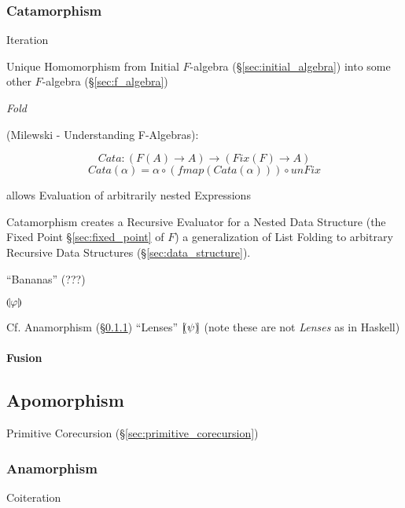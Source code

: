\subsubsection{Catamorphism}\label{sec:catamorphism}

Iteration

Unique Homomorphism from Initial $F$-algebra
(\S\ref{sec:initial_algebra}) into some other $F$-algebra
(\S\ref{sec:f_algebra})

\emph{Fold}

(Milewski - Understanding F-Algebras):

\[
  Cata : (F (A) \rightarrow A) \rightarrow (Fix (F) \rightarrow A)
\]\[
  Cata (\alpha) = \alpha \circ (fmap (Cata (\alpha))) \circ unFix
\]

allows Evaluation of arbitrarily nested Expressions

Catamorphism creates a Recursive Evaluator for a Nested Data Structure
(the Fixed Point \S\ref{sec:fixed_point} of $F$) a generalization of
List Folding to arbitrary Recursive Data Structures
(\S\ref{sec:data_structure}).

``Bananas'' (???) %

$\llparenthesis \varphi \rrparenthesis$

\fist Cf. Anamorphism (\S\ref{sec:anamorphism}) ``Lenses'' $[\kern-1.95pt(
\psi )\kern-2.0pt]$ (note these are not \emph{Lenses} as in Haskell)



\paragraph{Fusion}\label{sec:fusion}\hfill



\subsection{Apomorphism}\label{sec:apomorphism}

Primitive Corecursion (\S\ref{sec:primitive_corecursion})



\subsubsection{Anamorphism}\label{sec:anamorphism}

Coiteration

